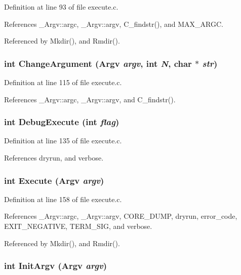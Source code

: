 Definition at line 93 of file execute.c.

References \_\-Argv::argc, \_\-Argv::argv, C\_\-findstr(), and MAX\_\-ARGC.

Referenced by Mkdir(), and Rmdir().
\subsubsection{\setlength{\rightskip}{0pt plus 5cm}int Change\-Argument (\bf{Argv} {\em argv}, int {\em N}, char $\ast$ {\em str})}\label{execute_8c_17a9d9f0557f51e462e8e1171e8359b0}




Definition at line 115 of file execute.c.

References \_\-Argv::argc, \_\-Argv::argv, and C\_\-findstr().
\subsubsection{\setlength{\rightskip}{0pt plus 5cm}int Debug\-Execute (int {\em flag})}\label{execute_8c_fb4d111c8bfb81eec580bdd25f7c9f69}




Definition at line 135 of file execute.c.

References dryrun, and verbose.
\subsubsection{\setlength{\rightskip}{0pt plus 5cm}int Execute (\bf{Argv} {\em argv})}\label{execute_8c_cef232b3eab001306f4955864e58114a}




Definition at line 158 of file execute.c.

References \_\-Argv::argc, \_\-Argv::argv, CORE\_\-DUMP, dryrun, error\_\-code, EXIT\_\-NEGATIVE, TERM\_\-SIG, and verbose.

Referenced by Mkdir(), and Rmdir().
\subsubsection{\setlength{\rightskip}{0pt plus 5cm}int Init\-Argv (\bf{Argv} {\em argv})}\label{execute_8c_440737c200f81511186927865ee87383}




